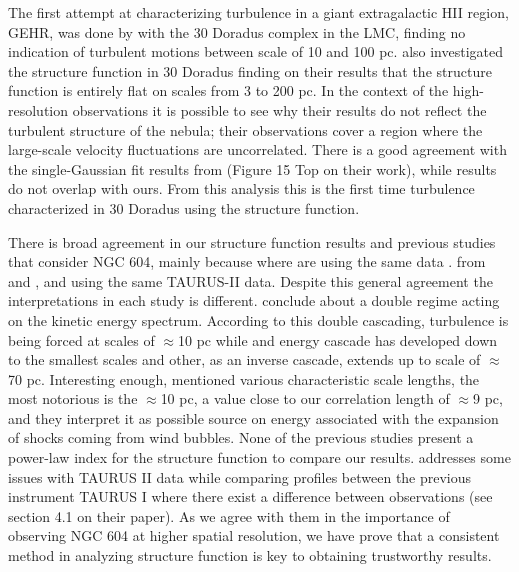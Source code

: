 \documentclass[fleqn,usenatbib, useAMS, a4paper]{mnras}
\begin{document}
The first attempt at characterizing turbulence in a giant extragalactic HII region, GEHR, was done by \citet{1961MNRAS.122....1F} with the 30 Doradus complex in the LMC, finding no indication of turbulent motions between scale of 10 and 100 pc.
\citet{2019arXiv191203543M} also investigated the structure function in 30 Doradus finding on their results that the structure function is entirely flat on scales from 3 to 200 pc.
In the context of the high-resolution observations it is possible to see why their results do not reflect the turbulent structure of the nebula; their observations cover a region where the large-scale velocity fluctuations are uncorrelated.
There is a good agreement with the single-Gaussian fit results from \citet{2019arXiv191203543M} (Figure 15 Top on their work), while \citet{1961MNRAS.122....1F} results do not overlap with ours.
From this analysis this is the first time turbulence characterized in 30 Doradus using the structure function.

There is broad agreement in our structure function results and previous studies that consider NGC 604, mainly because where are using the same data \citep{Medina-Tanco:1997a, Melnick:2021x}. 
from \citet{Medina-Tanco:1997a} and \citet{Melnick:2021x}, and using the same TAURUS-II data.
Despite this general agreement the interpretations in each study is different.
\citet{Medina-Tanco:1997a} conclude about a double regime acting on the kinetic energy spectrum.
According to this double cascading, turbulence is being forced at scales of \(\approx\)10 pc while and energy cascade has developed down to the smallest scales and other, as an inverse cascade, extends up to scale of \(\approx\)70 pc.
Interesting enough, \citet{Medina-Tanco:1997a} mentioned various characteristic scale lengths, the most notorious is the \(\approx\)10 pc, a value close to our correlation length of \(\approx\)9 pc, and they interpret it as possible source on energy associated with the expansion of shocks coming from wind bubbles.  
None of the previous studies present a power-law index for the structure function to compare our results.
\citet{2019arXiv191203543M} addresses some issues with TAURUS II data while comparing profiles between the previous instrument TAURUS I where there exist a difference between observations (see section 4.1 on their paper).
As we agree with them in the importance of observing NGC 604 at higher spatial resolution, we have prove that a consistent method in analyzing structure function is key to obtaining trustworthy results.
\end{document}
